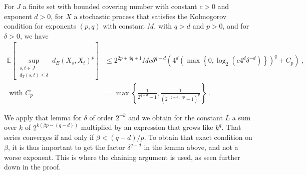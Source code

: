 \documentclass[lean]{Draft}
\makeatletter
\newcommand\leanlink{\begingroup\catcode`\#=12\relax\@leanlink}
\newcommand\@leanlink[2]{\endgroup
\href{#1}
{\texttt{\detokenize{#2}}}}
\newcommand{\docs}[1]{%
\leanlink{https://leanprover-community.github.io/mathlib4_docs/find/?pattern=#1\#doc}
{#1}}
\makeatother
\begin{document}
\begin{lemma}[\docs{ProbabilityTheory.finite_set_bound_of_edist_le}]\label{lem:finite_set_bound_of_dist_le}
For $J$ a finite set with bounded covering number with constant $c > 0$ and exponent $d > 0$, for $X$ a stochastic process that satisfies the Kolmogorov condition for exponents $(p, q)$ with constant $M$, with $q > d$ and $p > 0$, and for $\delta > 0$, we have
\begin{align*}
  \mathbb{E}\left[ \sup_{\substack{s, t \in J \\ d_T(s, t) \le \delta}} d_E(X_s, X_t)^p \right]
  &\le 2^{2p+4q+1} M c \delta^{q-d}\left( 4^d \left(\max\left\{0, \log_2 \left(c 4^d \delta^{-d}\right)\right\}\right)^q + C_p \right)
  \: ,
  \\
  \text{ with } C_p
  &= \max\left\{\frac{1}{2^{q-d} - 1}, \frac{1}{(2^{(q-d)/p} - 1)^p}\right\}
  \: .
\end{align*}
\end{lemma}

We apply that lemma for $\delta$ of order $2^{-k}$ and we obtain for the constant $L$ a sum over $k$ of $2^{k(\beta p - (q - d))}$ multiplied by an expression that grows like $k^q$.
That series converges if and only if $\beta < (q - d)/p$.
To obtain that exact condition on $\beta$, it is thus important to get the factor $\delta^{q-d}$ in the lemma above, and not a worse exponent.
This is where the chaining argument is used, as seen further down in the proof.
\end{document}

